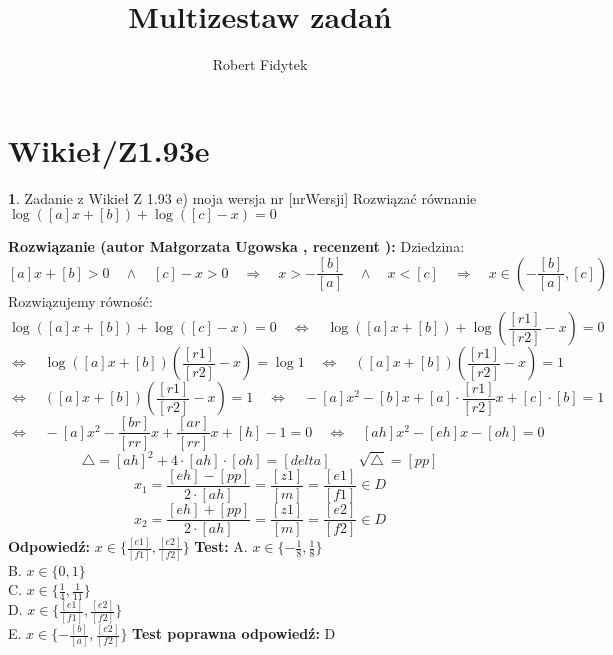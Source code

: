 \documentclass[12pt, a4paper]{article}
\title{Multizestaw zadań}
\author{Robert Fidytek}
\date{}
\theoremstyle{definition} %
\newtheorem{zad}{}
\newcommand{\kategoria}[1]{\section{#1}} %
\newcommand{\zadStart}[1]{\begin{zad}#1\newline} %
\newcommand{\zadStop}{\end{zad}}   %
\newcommand{\rozwStart}[2]{\noindent \textbf{Rozwiązanie (autor #1 , recenzent #2): }\newline} %
\newcommand{\rozwStop}{\newline}                                            %
\newcommand{\odpStart}{\noindent \textbf{Odpowiedź:}\newline}    %
\newcommand{\odpStop}{\newline}                                             %
\newcommand{\testStart}{\noindent \textbf{Test:}\newline} %
\newcommand{\testStop}{\newline} %
\newcommand{\kluczStart}{\noindent \textbf{Test poprawna odpowiedź:}\newline} %
\newcommand{\kluczStop}{\newline} %
\begin{document}
\maketitle


\kategoria{Wikieł/Z1.93e}
\zadStart{Zadanie z Wikieł Z 1.93 e) moja wersja nr [nrWersji]}
Rozwiązać równanie $\log{([a]x+[b])} + \log{([c]-x)} = 0$
\zadStop
\rozwStart{Małgorzata Ugowska}{}
Dziedzina:
$$[a]x+[b] > 0 \quad \land \quad [c]-x > 0 \quad \Longrightarrow \quad x > -\frac{[b]}{[a]} \quad \land \quad x<[c]  \quad \Longrightarrow \quad x \in (-\frac{[b]}{[a]}, [c])$$
Rozwiązujemy równo\'sć:
$$\log{([a]x+[b])} + \log{([c]-x)} = 0 \quad \Longleftrightarrow \quad \log{([a]x+[b])} + \log{(\frac{[r1]}{[r2]}-x)} = 0 $$
$$ \Longleftrightarrow \quad \log{([a]x+[b])(\frac{[r1]}{[r2]}-x)} = \log{1} \quad \Longleftrightarrow \quad ([a]x+[b])(\frac{[r1]}{[r2]}-x) = 1 $$
$$ \Longleftrightarrow \quad ([a]x+[b])(\frac{[r1]}{[r2]}-x) = 1 \quad \Longleftrightarrow \quad -[a] x^2 -[b] x + [a] \cdot \frac{[r1]}{[r2]} x + [c] \cdot [b] = 1$$
$$ \Longleftrightarrow \quad -[a] x^2 -\frac{[br]}{[rr]} x + \frac{[ar]}{[rr]} x + [h] -1 =0 \quad \Longleftrightarrow \quad [ah] x^2 - [eh] x - [oh]=0$$
$$ \bigtriangleup =[ah]^2+4 \cdot [ah] \cdot [oh] = [delta] \qquad \sqrt{\bigtriangleup} = [pp]$$
$$ x_1 = \frac{[eh]-[pp]}{2 \cdot [ah]} = \frac{[z1]}{[m]} = \frac{[e1]}{[f1]} \in D$$
$$ x_2 = \frac{[eh]+[pp]}{2 \cdot [ah]} = \frac{[z1]}{[m]} = \frac{[e2]}{[f2]} \in D$$
\rozwStop
\odpStart
$x \in \{\frac{[e1]}{[f1]}, \frac{[e2]}{[f2]}\}$
\odpStop
\testStart
A. $x \in \{-\frac{1}{8}, \frac{1}{8}\}$\\
B. $x \in \{0, 1\}$\\
C. $x \in \{\frac{1}{4}, \frac{1}{11}\}$\\
D. $x \in \{\frac{[e1]}{[f1]}, \frac{[e2]}{[f2]}\}$\\
E. $x \in \{-\frac{[b]}{[a]}, \frac{[e2]}{[f2]}\}$
\testStop
\kluczStart
D
\kluczStop
\end{document}
